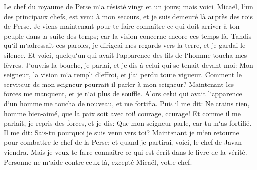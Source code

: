 \verse Le chef du royaume de Perse m`a résisté vingt et un jours; mais voici, Micaël, l`un des principaux chefs, est venu à mon secours, et je suis demeuré là auprès des rois de Perse. 
\verse Je viens maintenant pour te faire connaître ce qui doit arriver à ton peuple dans la suite des temps; car la vision concerne encore ces temps-là. 
\verse Tandis qu`il m`adressait ces paroles, je dirigeai mes regards vers la terre, et je gardai le silence. 
\verse Et voici, quelqu`un qui avait l`apparence des fils de l`homme toucha mes lèvres. J`ouvris la bouche, je parlai, et je dis à celui qui se tenait devant moi: Mon seigneur, la vision m`a rempli d`effroi, et j`ai perdu toute vigueur. 
\verse Comment le serviteur de mon seigneur pourrait-il parler à mon seigneur? Maintenant les forces me manquent, et je n`ai plus de souffle. 
\verse Alors celui qui avait l`apparence d`un homme me toucha de nouveau, et me fortifia. 
\verse Puis il me dit: Ne crains rien, homme bien-aimé, que la paix soit avec toi! courage, courage! Et comme il me parlait, je repris des forces, et je dis: Que mon seigneur parle, car tu m`as fortifié. 
\verse Il me dit: Sais-tu pourquoi je suis venu vers toi? Maintenant je m`en retourne pour combattre le chef de la Perse; et quand je partirai, voici, le chef de Javan viendra. 
\verse Mais je veux te faire connaître ce qui est écrit dans le livre de la vérité. Personne ne m`aide contre ceux-là, excepté Micaël, votre chef. 

